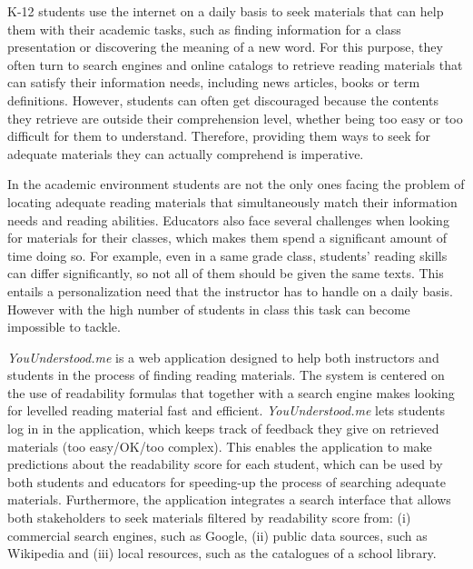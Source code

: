 \documentclass{sig-alternate-05-2015}
\begin{document}
K-12 students use the internet on a daily basis to seek materials that can help them with their academic tasks, such as finding information for a class presentation or discovering the meaning of a new word. For this purpose, they often turn to search engines and online catalogs to retrieve reading materials that can satisfy their information needs, including news articles, books or term definitions. However, students can often get discouraged because the contents they retrieve are outside their comprehension level, whether being too easy or too difficult  for them to understand. Therefore, providing them ways to seek for adequate materials they can actually comprehend is imperative.



In the academic environment students are not the only ones facing the problem of locating adequate reading materials that simultaneously match their information needs and reading abilities. Educators also face several challenges when looking for materials for their classes, which makes them spend a significant amount of time doing so. For example, even in a same grade class, students' reading skills can differ significantly, so not all of them should be given the same texts. This entails a personalization need that the instructor has to handle on a daily basis. However with the high number of students in class this task can become impossible to tackle. 





\textit{YouUnderstood.me} is a web application designed to help  both instructors and students in the process of finding reading materials. The system is centered on the use of readability formulas that together with a search engine makes looking for levelled reading material fast and efficient. \textit{YouUnderstood.me} lets students log in in the application, which keeps track of  feedback they give on retrieved materials (too easy/OK/too complex). This enables the application to make predictions about the readability score for each student, which can be used by both students and educators for speeding-up the process of searching adequate materials. Furthermore, the application integrates a search interface that allows both stakeholders to seek materials filtered by readability score from: (i) commercial search engines, such as Google, (ii) public data sources, such as Wikipedia and (iii) local resources, such as the catalogues of a school library.
\end{document}
